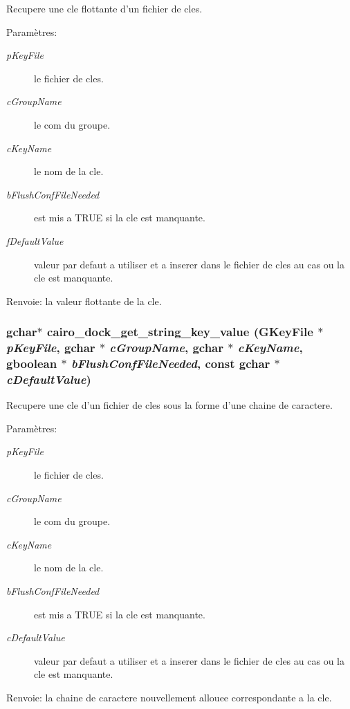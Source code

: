 Recupere une cle flottante d'un fichier de cles. \begin{Desc}
\item[Param\`{e}tres:]
\begin{description}
\item[{\em p\-Key\-File}]le fichier de cles. \item[{\em c\-Group\-Name}]le com du groupe. \item[{\em c\-Key\-Name}]le nom de la cle. \item[{\em b\-Flush\-Conf\-File\-Needed}]est mis a TRUE si la cle est manquante. \item[{\em f\-Default\-Value}]valeur par defaut a utiliser et a inserer dans le fichier de cles au cas ou la cle est manquante. \end{description}
\end{Desc}
\begin{Desc}
\item[Renvoie:]la valeur flottante de la cle. \end{Desc}
\subsubsection{\setlength{\rightskip}{0pt plus 5cm}gchar$\ast$ cairo\_\-dock\_\-get\_\-string\_\-key\_\-value (GKey\-File $\ast$ {\em p\-Key\-File}, gchar $\ast$ {\em c\-Group\-Name}, gchar $\ast$ {\em c\-Key\-Name}, gboolean $\ast$ {\em b\-Flush\-Conf\-File\-Needed}, const gchar $\ast$ {\em c\-Default\-Value})}\label{cairo-dock-config_8c_f95ee7aa52a85f3f38ecc289f55b7c32}


Recupere une cle d'un fichier de cles sous la forme d'une chaine de caractere. \begin{Desc}
\item[Param\`{e}tres:]
\begin{description}
\item[{\em p\-Key\-File}]le fichier de cles. \item[{\em c\-Group\-Name}]le com du groupe. \item[{\em c\-Key\-Name}]le nom de la cle. \item[{\em b\-Flush\-Conf\-File\-Needed}]est mis a TRUE si la cle est manquante. \item[{\em c\-Default\-Value}]valeur par defaut a utiliser et a inserer dans le fichier de cles au cas ou la cle est manquante. \end{description}
\end{Desc}
\begin{Desc}
\item[Renvoie:]la chaine de caractere nouvellement allouee correspondante a la cle. \end{Desc}
